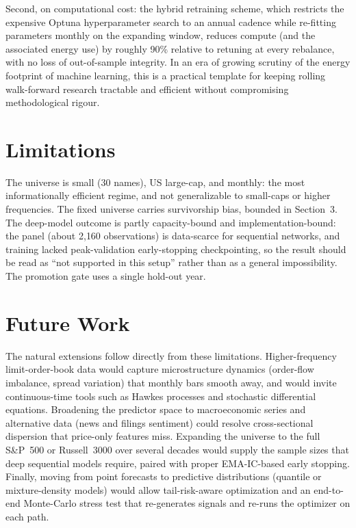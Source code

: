 \documentclass[11pt]{article}
\begin{document}
Second, on computational cost: the hybrid retraining scheme, which restricts the expensive Optuna
hyperparameter search to an annual cadence while re-fitting parameters monthly on the expanding
window, reduces compute (and the associated energy use) by roughly 90\% relative to retuning at
every rebalance, with no loss of out-of-sample integrity. In an era of growing scrutiny of the
energy footprint of machine learning, this is a practical template for keeping rolling
walk-forward research tractable and efficient without compromising methodological rigour.

\section{Limitations}
The universe is small (30 names), US large-cap, and monthly: the most informationally efficient
regime, and not generalizable to small-caps or higher frequencies. The fixed universe carries
survivorship bias, bounded in Section~3. The deep-model outcome is partly capacity-bound and
implementation-bound: the panel (about 2{,}160 observations) is data-scarce for sequential
networks, and training lacked peak-validation early-stopping checkpointing, so the result should
be read as ``not supported in this setup'' rather than as a general impossibility. The promotion
gate uses a single hold-out year.

\section{Future Work}
The natural extensions follow directly from these limitations. Higher-frequency limit-order-book
data would capture microstructure dynamics (order-flow imbalance, spread variation) that monthly
bars smooth away, and would invite continuous-time tools such as Hawkes processes and stochastic
differential equations. Broadening the predictor space to macroeconomic series and alternative
data (news and filings sentiment) could resolve cross-sectional dispersion that price-only
features miss. Expanding the universe to the full S\&P~500 or Russell~3000 over several decades
would supply the sample sizes that deep sequential models require, paired with proper
EMA-IC-based early stopping. Finally, moving from point forecasts to predictive distributions
(quantile or mixture-density models) would allow tail-risk-aware optimization and an end-to-end
Monte-Carlo stress test that re-generates signals and re-runs the optimizer on each path.
\end{document}
